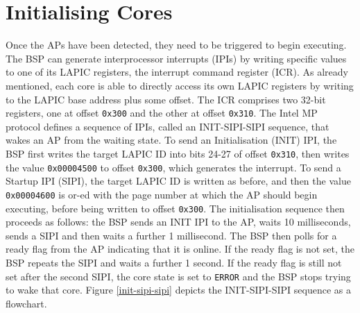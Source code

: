 \documentclass[bsc,frontabs,singlespacing,parskip,deptreport]{infthesis}
\begin{document}
\section{Initialising Cores} \label{initialising-cores}
Once the APs have been detected, they need to be triggered to begin executing. The BSP can generate interprocessor interrupts (IPIs) by writing specific values to one of its LAPIC registers, the interrupt command register (ICR). As already mentioned, each core is able to directly access its own LAPIC registers by writing to the LAPIC base address plus some offset. The ICR comprises two 32-bit registers, one at offset \verb|0x300| and the other at offset \verb|0x310|. The Intel MP protocol defines a sequence of IPIs, called an INIT-SIPI-SIPI sequence, that wakes an AP from the waiting state. To send an Initialisation (INIT) IPI, the BSP first writes the target LAPIC ID into bits 24-27 of offset \verb|0x310|, then writes the value \verb|0x00004500| to offset \verb|0x300|, which generates the interrupt. To send a Startup IPI (SIPI), the target LAPIC ID is written as before, and then the value \verb|0x00004600| is or-ed with the page number at which the AP should begin executing, before being written to offset \verb|0x300|. The initialisation sequence then proceeds as follows: the BSP sends an INIT IPI to the AP, waits 10 milliseconds, sends a SIPI and then waits a further 1 millisecond. The BSP then polls for a ready flag from the AP indicating that it is online. If the ready flag is not set, the BSP repeats the SIPI and waits a further 1 second. If the ready flag is still not set after the second SIPI, the core state is set to \verb|ERROR| and the BSP stops trying to wake that core. Figure \ref{init-sipi-sipi} depicts the INIT-SIPI-SIPI sequence as a flowchart.
\end{document}
